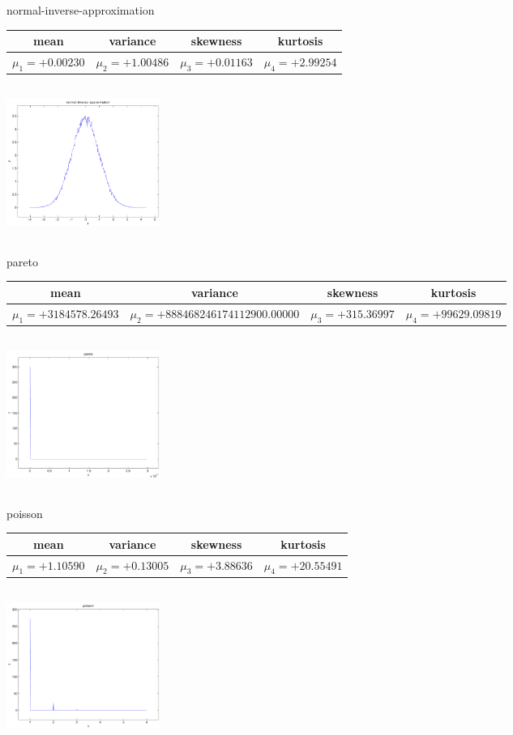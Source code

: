 \documentclass[9pt]{article}
\theoremstyle{plain}
\theoremstyle{definition}
\theoremstyle{remark}
\numberwithin{equation}{section}
\begin{document}
\newpage
normal-inverse-approximation \begin{tabular}{|c|c|c|c|}  mean & variance & skewness & kurtosis \\  \hline
$\mu_1 = +0.00230$ & $\mu_2 = +1.00486$ & $\mu_3 = +0.01163$ & $\mu_4 =+2.99254$ \\
\end{tabular}

\includegraphics[width=5cm,height=5cm]{normal-inverse-approximation.pdf}

pareto \begin{tabular}{|c|c|c|c|}  mean & variance & skewness & kurtosis \\  \hline
$\mu_1 = +3184578.26493$ & $\mu_2 = +888468246174112900.00000$ & $\mu_3 = +315.36997$ & $\mu_4 =+99629.09819$ \\
\end{tabular}

\includegraphics[width=5cm,height=5cm]{pareto.pdf}

poisson \begin{tabular}{|c|c|c|c|}  mean & variance & skewness & kurtosis \\  \hline
$\mu_1 = +1.10590$ & $\mu_2 = +0.13005$ & $\mu_3 = +3.88636$ & $\mu_4 =+20.55491$ \\
\end{tabular}

\includegraphics[width=5cm,height=5cm]{poisson.pdf}
\end{document}
